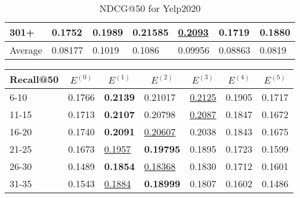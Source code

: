 \begin{table*}[]
\begin{tabular}{|l|l|l|l|l|l|l|}
        301+    & 0.1752                         & 0.1989                         & \textbf{0.21585}               & \underline{0.2093}             & 0.1719                         & 0.1880                         \\ \hline
        Average & 0.08177                        & 0.1019                         & 0.1086                         & 0.09956                        & 0.08863                        & 0.0819                         \\ \hline
    \end{tabular}
    \caption{NDCG@50 for Yelp2020}
    \label{tab:yelp2020-ndcg-evaluation}
\end{table*}
\begin{table*}[]
    \begin{tabular}{|l|l|l|l|l|l|l|}
        \hline
        Recall@50 & \multicolumn{1}{c|}{$E^{(0)}$} & \multicolumn{1}{c|}{$E^{(1)}$} & \multicolumn{1}{c|}{$E^{(2)}$} & \multicolumn{1}{c|}{$E^{(3)}$} & \multicolumn{1}{c|}{$E^{(4)}$} & \multicolumn{1}{c|}{$E^{(5)}$} \\ \hline
        6-10      & 0.1766                         & \textbf{0.2139}                & 0.21017                        & \underline{0.2125}             & 0.1905                         & 0.1717                         \\ \hline
        11-15     & 0.1713                         & \textbf{0.2107}                & 0.20798                        & \underline{0.2087}             & 0.1847                         & 0.1672                         \\ \hline
        16-20     & 0.1740                         & \textbf{0.2091}                & \underline{0.20607}            & 0.2038                         & 0.1843                         & 0.1675                         \\ \hline
        21-25     & 0.1673                         & \underline{0.1957}             & \textbf{0.19795}               & 0.1895                         & 0.1723                         & 0.1599                         \\ \hline
        26-30     & 0.1489                         & \textbf{0.1854}                & \underline{0.18368}            & 0.1830                         & 0.1712                         & 0.1601                         \\ \hline
        31-35     & 0.1543                         & \underline{0.1884}             & \textbf{0.18999}               & 0.1807                         & 0.1602                         & 0.1486                         \\ \hline

\end{tabular}
\end{table*}
